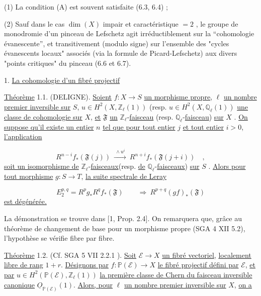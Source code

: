 (1) La condition (A) est souvent satisfaite (6.3, 6.4) ;

(2) Sauf dans le cas $\dim(X)$ impair et caractéristique $= 2$ , le groupe de monodromie d'un pinceau de Lefschetz agit irréductiblement sur la ``cohomologie évanescente'', et transitivement (modulo signe) sur l'ensemble des
"cycles évanescents locaux" associés (via la formule de Picard-Lefschetz) aux divers "points critiques" du pinceau (6.6 et 6.7).


1. \underline{La cohomologie d'un fibré projectif}

\underline{Théorème} 1.1. (DELIGNE). \underline{Soient} $f : X \longrightarrow S$ \underline{un morphisme propre}, $\ell$ \underline{un nombre premier inversible sur} $S$, $u \in H^2(X,\mathbb{Z}_\ell(1))$ (resp. $u \in H^2(X,\mathbb{Q}_\ell(1))$ \underline{une classe de cohomologie sur} $X$, \underline{et} $\mathfrak{F}$ \underline{un} $\mathbb{Z}_\ell$-\underline{faisceau} (resp. $\mathbb{Q}_\ell$-\underline{faisceau}) \underline{sur} $X$ . \underline{On suppose qu'il existe un entier} $n$ \underline{tel que pour tout entier} $j$ \underline{et tout entier} $i > 0$, \underline{l'application}

\begin{equation}\tag{1.1.1}
R^{n-i} f_*(\mathfrak{F}(j)) \ \xrightarrow{\ \wedge u^i\ }\ R^{n+i} f_*(\mathfrak{F}(j+i)) \quad ,
\end{equation}
\underline{soit un isomorphisme de} $\mathbb{Z}_\ell$-\underline{faisceaux}(resp. \underline{de} $\mathbb{Q}_\ell$-\underline{faisceaux}) \underline{sur} $S$ . \underline{Alors pour tout morphisme} $g : S \longrightarrow T$, \underline{la suite spectrale de Leray}

\begin{equation*}
E_2^{p,q} = R^p g_* R^q f_*(\mathfrak{F}) \qquad \Longrightarrow\ R^{p+q}(gf)_*(\mathfrak{F})
\end{equation*}
\underline{est dégénérée.}

La démonstration se trouve dans [1, Prop. 2.4]. On remarquera que, grâce au théorème de changement de base pour un morphisme propre (SGA 4 XII  5.2), l'hypothèse se vérifie fibre par fibre.



\underline{Théorème} 1.2. (Cf. SGA 5 VII 2.2.1 ). \underline{Soit} $\mathcal{E} \longrightarrow X$ \underline{un fibré vectoriel}, \underline{localement libre de rang} $1 + r$. \underline{Désignons par} $f : \mathbb{P}(\mathcal{E}) \longrightarrow X$ \underline{le fibré projectif défini par} $\mathcal{E}$, \underline{et par} $u \in H^2(\mathbb{P}(\mathcal{E}),\mathbb{Z}_\ell(1))$ \underline{la première classe de Chern du faisceau inversible canonique} $\underline{O}_{\mathbb{P}(\mathcal{E})}(1)$. \underline{Alors, pour} $\ell$ \underline{un nombre premier inversible sur} $X$, \underline{on a}

